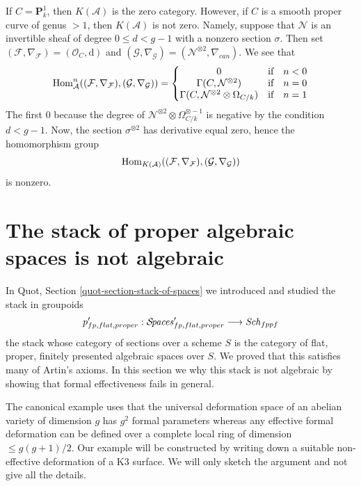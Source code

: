 \medskip\noindent
If $C = \mathbf{P}^1_k$, then $K(\mathcal{A})$ is the zero category.
However, if $C$ is a smooth proper curve of genus $> 1$, then
$K(\mathcal{A})$ is not zero. Namely, suppose that $\mathcal{N}$
is an invertible sheaf
of degree $0 \leq d < g - 1$ with a nonzero section $\sigma$.
Then set
$(\mathcal{F}, \nabla_\mathcal{F}) = (\mathcal{O}_C, \text{d})$
and
$(\mathcal{G}, \nabla_\mathcal{G}) = (\mathcal{N}^{\otimes 2}, \nabla_{can})$.
We see that
$$
\mathop{\mathrm{Hom}}\nolimits_\mathcal{A}^n((\mathcal{F}, \nabla_\mathcal{F}),
(\mathcal{G}, \nabla_\mathcal{G})) =
\left\{
\begin{matrix}
0 & \text{if} & n < 0 \\
\Gamma(C, \mathcal{N}^{\otimes 2}) & \text{if} & n = 0 \\
\Gamma(C, \mathcal{N}^{\otimes 2} \otimes \Omega_{C/k}) & \text{if} & n = 1
\end{matrix}
\right.
$$
The first $0$ because the degree of
$\mathcal{N}^{\otimes 2} \otimes \Omega_{C/k}^{\otimes -1}$
is negative by the condition $d < g - 1$. Now, the section
$\sigma^{\otimes 2}$ has derivative equal zero, hence the homomorphism
group
$$
\mathop{\mathrm{Hom}}\nolimits_{K(\mathcal{A})}((\mathcal{F}, \nabla_\mathcal{F}),
(\mathcal{G}, \nabla_\mathcal{G}))
$$
is nonzero.






\section{The stack of proper algebraic spaces is not algebraic}
\label{section-proper-spaces-not-algebraic}

\noindent
In Quot, Section \ref{quot-section-stack-of-spaces}
we introduced and studied the stack in groupoids
$$
p'_{fp, flat, proper} :
\mathcal{S}\!\mathit{paces}'_{fp, flat, proper}
\longrightarrow
\mathit{Sch}_{fppf}
$$
the stack whose category of sections over a scheme $S$
is the category of flat, proper, finitely presented algebraic
spaces over $S$. We proved that this satisfies many of
Artin's axioms. In this section we why this stack
is not algebraic by showing that formal effectiveness
fails in general.

\medskip\noindent
The canonical example uses that the universal deformation space of
an abelian variety of dimension $g$ has $g^2$ formal parameters
whereas any effective formal deformation can be defined over a
complete local ring of dimension $\leq g(g + 1)/2$.
Our example will be constructed by writing down a
suitable non-effective deformation of a K3 surface.
We will only sketch the argument and not give all the details.

